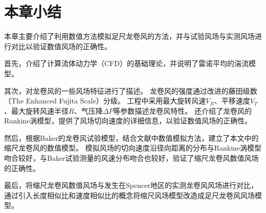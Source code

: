 \section{本章小结}
本章主要介绍了利用数值方法模拟足尺龙卷风的方法，并与试验风场与实测风场进行对比以验证数值风场的正确性。

首先，介绍了计算流体动力学（CFD）的基础理论，并说明了雷诺平均的湍流模型。

其次，对龙卷风的一些风场特征进行了描述。
龙卷风的强度通过改进的藤田级数（The Enhanced Fujita Scale）分级。
工程中采用最大旋转风速$V_R$、平移速度$V_T$、最大旋转风速半径$R$、气压降$\Delta P$等参数描述龙卷风特性。
还介绍了龙卷风的Rankine涡模型，提供了风场切向速度的详细信息，以验证数值风场的正确性。

然后，根据Baker的龙卷风试验模型，结合文献中数值模拟方法，建立了本文中的缩尺龙卷风的数值模型。
模拟风场的切向速度沿径向距离的分布与Rankine涡模型吻合较好，与Baker试验测量的风速分布吻合也较好，验证了缩尺龙卷风数值风场的正确性。

最后，将缩尺龙卷风数值风场与发生在Spencer地区的实测龙卷风风场进行对比，通过引入长度相似比和速度相似比的概念将缩尺风场模型改造成足尺龙卷风风场模型。
